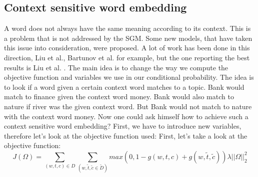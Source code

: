 \subsection{Context sensitive word embedding}
A word does not always have the same meaning according to its context. This is a problem that is not addressed by the SGM. Some new models, that have taken this issue into consideration, were proposed. A lot of work has been done in this direction, Liu et al.\cite{topicalWE},  Bartunov et al.\cite{breaking} for example, but the one reporting the best results is Liu et al. \cite{contextWithTensor}. The main idea is to change the way we compute the objective function and variables we use in our conditional probability. The idea is to look if a word given a certain context word matches to a topic. Bank would match to finance given the context word money. Bank would also match to nature if river was the given context word. But Bank would not match to nature with the context word money. Now one could ask himself how to achieve such a context sensitive word embedding? First, we have to introduce new variables, therefore let's look at the objective function used: 
First, let's take a look at the objective function:
\begin{equation}
J(\Omega) = \sum_{(w,t,c)\in D} \sum_{(w,\tilde{t},\tilde{c} \in{\tilde{D}})} max(0,1- g(w,t,c) + g(w,\tilde{t},\tilde{c})) \lambda||\Omega||_{2}^2
\end{equation}

